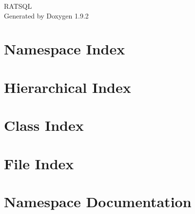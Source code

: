 \documentclass[twoside]{book}
\newcommand{\+}{\discretionary{\mbox{\scriptsize$\hookleftarrow$}}{}{}}
\newcommand{\clearemptydoublepage}{%
    \newpage{\pagestyle{empty}\cleardoublepage}%
  }
\begin{document}
  \raggedbottom
    \hypersetup{pageanchor=false,
                bookmarksnumbered=true,
                pdfencoding=unicode
               }
  \begin{titlepage}
  \vspace*{7cm}
  \begin{center}%
  {\Large RATSQL}\\
  \vspace*{1cm}
  {\large Generated by Doxygen 1.9.2}\\
  \end{center}
  \end{titlepage}
  \clearemptydoublepage
  \tableofcontents
  \clearemptydoublepage
  \hypersetup{pageanchor=true}
\chapter{Namespace Index}

\chapter{Hierarchical Index}

\chapter{Class Index}

\chapter{File Index}

\chapter{Namespace Documentation}



\end{document}
